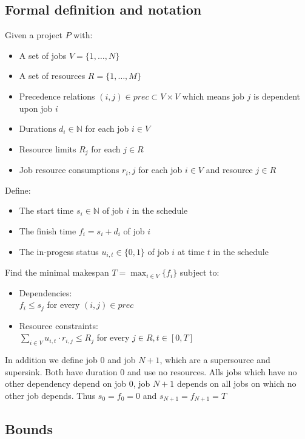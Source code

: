 \documentclass{sig-alternate}
\begin{document}
\subsection{Formal definition and notation}
Given a project $P$ with:
\begin{itemize}
\item A set of jobs $V = \{1,\ldots,N\}$ 
\item A set of resources $R = \{1,\ldots,M\}$
\item Precedence relations $(i,j) \in prec \subset V \times V$ which means job $j$ is dependent upon job $i$
\item Durations $d_i \in \mathbb{N}$ for each job $i \in V$
\item Resource limits $R_j$ for each $j \in R$
\item Job resource consumptions $r_i,j$ for each job $i \in V$ and resource $j \in R$
\end{itemize}

Define:
\begin{itemize}
\item The start time $s_i \in \mathbb{N}$ of job $i$ in the schedule
\item The finish time $f_i = s_i + d_i$ of job $i$
\item The in-progess status $u_{i,t} \in \{0,1\}$ of job $i$ at time $t$ in the schedule
\end{itemize}

Find the minimal makespan $T = \max_{i \in V}\{f_i\}$ subject to:
\begin{itemize}
\item Dependencies: \\ $f_i \leq s_j$ for every $(i,j) \in prec$
\item Resource constraints: \\ $\sum_{i \in V}{u_{i,t} \cdot r_{i,j}} \leq R_j$ for every $j \in R, t \in [0,T]$
\end{itemize}

In addition we define job $0$ and job $N+1$, which are a supersource and supersink.
Both have duration $0$ and use no resources.
Alls jobs which have no other dependency depend on job $0$, job $N+1$ depends on all jobs on which no other job depends.
Thus $s_0 = f_0 = 0$ and $s_{N+1} = f_{N+1} = T$

\subsection{Bounds}
\end{document}
